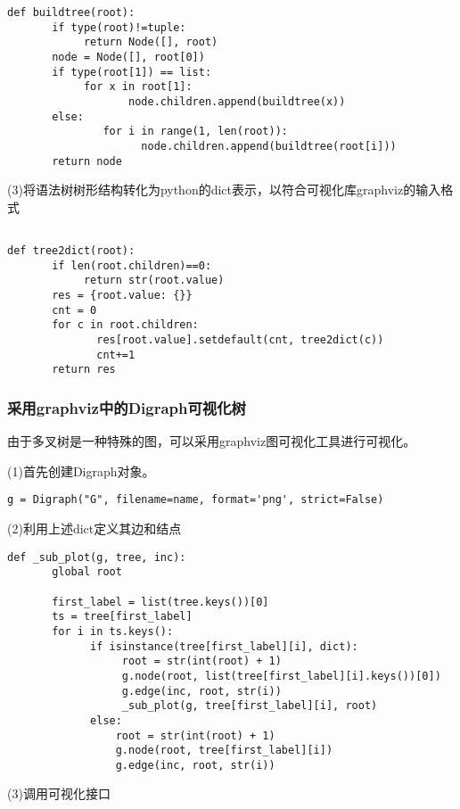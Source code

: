\documentclass{article}
\begin{document}
\begin{verbatim}
def buildtree(root):
       if type(root)!=tuple:
            return Node([], root)
       node = Node([], root[0])
       if type(root[1]) == list:
            for x in root[1]:
                   node.children.append(buildtree(x))
       else:
               for i in range(1, len(root)):
                     node.children.append(buildtree(root[i]))
       return node
\end{verbatim}

(3)将语法树树形结构转化为python的dict表示，以符合可视化库graphviz的输入格式

\begin{verbatim}

def tree2dict(root):
       if len(root.children)==0:
            return str(root.value)
       res = {root.value: {}}
       cnt = 0
       for c in root.children:
              res[root.value].setdefault(cnt, tree2dict(c))
              cnt+=1
       return res
\end{verbatim}

\subsubsection{采用graphviz中的Digraph可视化树}

由于多叉树是一种特殊的图，可以采用graphviz图可视化工具进行可视化。

(1)首先创建Digraph对象。

\begin{verbatim}
g = Digraph("G", filename=name, format='png', strict=False)
\end{verbatim}

(2)利用上述dict定义其边和结点

\begin{verbatim}
def _sub_plot(g, tree, inc):
       global root

       first_label = list(tree.keys())[0]
       ts = tree[first_label]
       for i in ts.keys():
             if isinstance(tree[first_label][i], dict):
                  root = str(int(root) + 1)
                  g.node(root, list(tree[first_label][i].keys())[0])
                  g.edge(inc, root, str(i))
                  _sub_plot(g, tree[first_label][i], root)
             else:
                 root = str(int(root) + 1)
                 g.node(root, tree[first_label][i])
                 g.edge(inc, root, str(i))
\end{verbatim}

(3)调用可视化接口
\end{document}
